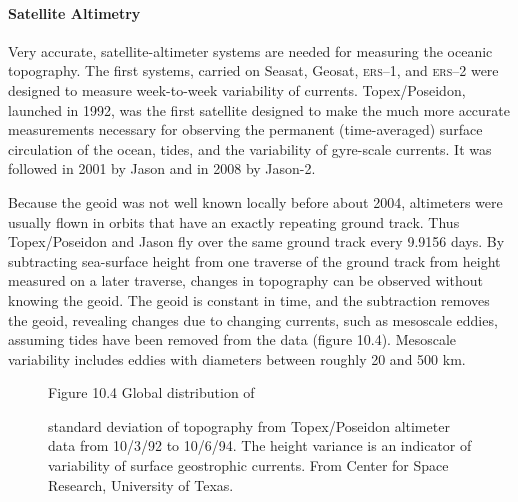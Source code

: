 \paragraph{Satellite Altimetry}
Very accurate, satellite-altimeter systems
are needed for measuring the oceanic topography. The first systems,
carried on Seasat, Geosat, \textsc{ers}--1, and
\textsc{ers}--2 were designed to measure
week-to-week variability of
currents. Topex/Poseidon, launched in 1992, was
the first satellite designed to make the much more accurate
measurements necessary for observing the permanent (time-averaged)
surface circulation of the ocean, tides, and the variability of
gyre-scale currents. It was followed in 2001 by Jason and
in 2008 by Jason-2.

Because the geoid was not well known locally before about
2004, altimeters were usually flown in orbits that have an exactly
repeating ground track. Thus Topex/Poseidon and
Jason fly over the same ground track every 9.9156
days. By subtracting sea-surface height from one traverse of the
ground track from height measured on a later traverse, changes in
topography can be observed without knowing the geoid. The
geoid is constant in time, and the subtraction removes
the geoid, revealing changes due to changing currents, such as
mesoscale eddies, assuming tides have been
removed from the data (figure 10.4). Mesoscale variability includes
eddies with diameters between roughly 20 and 500 km.

\begin{figure}[t!]
\footnotesize
Figure 10.4 Global distribution of \rule{0mm}{3ex}standard deviation
of topography from Topex/Poseidon altimeter data from 10/3/92 to 10/6/94. The height
variance is an indicator of variability of surface geostrophic
currents. From Center for
Space Research, University of Texas.
\label{fig:sshvariability}
\vspace{-4ex}
\end{figure}

